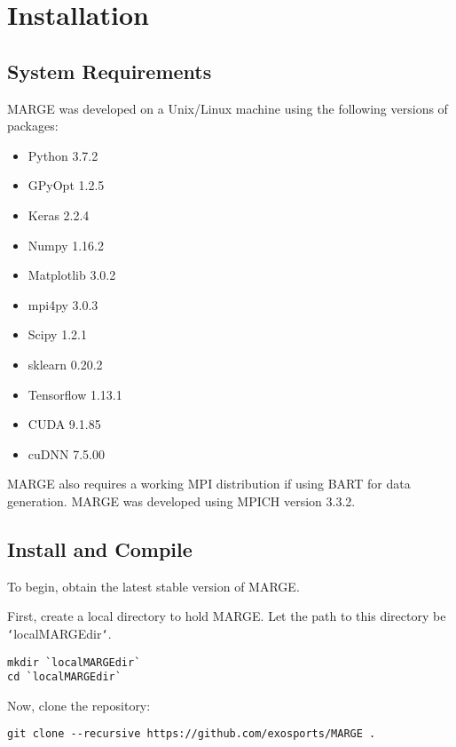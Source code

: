 \documentclass[letterpaper, 12pt]{article}
\begin{document}
\section{Installation}
\label{sec:installation}

\subsection{System Requirements}
\label{sec:requirements}

\noindent MARGE was developed on a Unix/Linux machine using the following 
versions of packages:

\begin{itemize}
\item Python 3.7.2
\item GPyOpt 1.2.5
\item Keras 2.2.4
\item Numpy 1.16.2
\item Matplotlib 3.0.2
\item mpi4py 3.0.3
\item Scipy 1.2.1
\item sklearn 0.20.2
\item Tensorflow 1.13.1
\item CUDA 9.1.85
\item cuDNN 7.5.00
\end{itemize}

\noindent MARGE also requires a working MPI distribution if using BART for 
data generation.  MARGE was developed using MPICH version 3.3.2.



\subsection{Install and Compile}
\label{sec:install}

\noindent To begin, obtain the latest stable version of MARGE.  

\noindent First, create a local directory to hold MARGE.  Let the path to this 
directory be \texttt{`}localMARGEdir\texttt{`}.

\begin{verbatim}
mkdir `localMARGEdir`
cd `localMARGEdir`
\end{verbatim}

\noindent Now, clone the repository:
\begin{verbatim}
git clone --recursive https://github.com/exosports/MARGE .
\end{verbatim}
\end{document}
